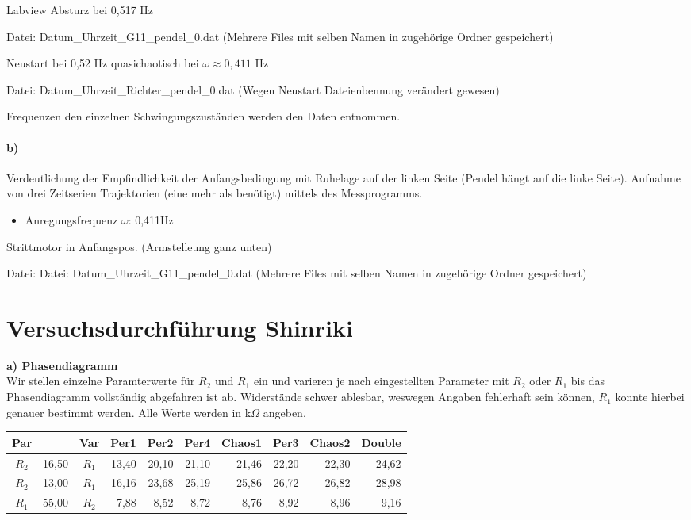 Labview Absturz bei 0,517 Hz 

Datei: Datum\_Uhrzeit\_G11\_pendel\_0.dat (Mehrere Files mit selben Namen in zugehörige Ordner gespeichert)

Neustart bei 0,52 Hz
quasichaotisch bei $\omega\approx0,411$ Hz

Datei: Datum\_Uhrzeit\_Richter\_pendel\_0.dat (Wegen Neustart Dateienbennung verändert gewesen)

Frequenzen den einzelnen Schwingungszuständen werden den Daten entnommen.

\paragraph{b)}
Verdeutlichung der Empfindlichkeit der Anfangsbedingung mit Ruhelage auf der linken Seite (Pendel hängt auf die linke Seite). Aufnahme von drei Zeitserien Trajektorien (eine mehr als benötigt) mittels des Messprogramms.
\begin{itemize}
    \item Anregungsfrequenz $\omega$: 0,411Hz
\end{itemize}
Strittmotor in Anfangspos. (Armstelleung ganz unten)

Datei: Datei: Datum\_Uhrzeit\_G11\_pendel\_0.dat (Mehrere Files mit selben Namen in zugehörige Ordner gespeichert)

\section{Versuchsdurchführung Shinriki}
\label{sec:versuchShin}
\textbf{a) Phasendiagramm}\\
Wir stellen einzelne Paramterwerte für $R_2$ und $R_1$ ein und varieren je nach eingestellten Parameter mit $R_2$ oder $R_1$ bis das Phasendiagramm vollständig abgefahren ist ab. Widerstände schwer ablesbar, weswegen Angaben fehlerhaft sein können, $R_1$ konnte hierbei genauer bestimmt werden. Alle Werte werden in $\text{k}\Omega$ angeben.\\
\begin{tabular}{c  r| c  r  r  r  r  r  r  r}
    Par &  & Var & Per1 & Per2 & Per4 & Chaos1 & Per3 & Chaos2 & Double\\
    \hline
    $R_2$ & 16,50 & $R_1$ & 13,40 & 20,10 & 21,10 & 21,46 & 22,20 & 22,30 & 24,62\\
    $R_2$ & 13,00 & $R_1$ & 16,16 & 23,68 & 25,19 & 25,86 & 26,72 & 26,82 & 28,98\\
    $R_1$ & 55,00 & $R_2$ & 7,88  & 8,52 & 8,72 & 8,76 & 8,92 & 8,96 & 9,16\\
\end{tabular}\\

